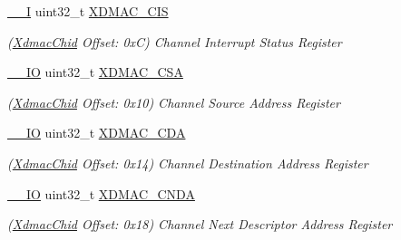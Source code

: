 \begin{DoxyCompactItemize}
\mbox{\label{structXdmacChid_a5105999966c7ec3deb32f942088364ee}} 
\mbox{\hyperlink{core__cm7_8h_af63697ed9952cc71e1225efe205f6cd3}{\+\_\+\+\_\+I}} uint32\+\_\+t \mbox{\hyperlink{structXdmacChid_a5105999966c7ec3deb32f942088364ee}{X\+D\+M\+A\+C\+\_\+\+C\+IS}}
\begin{DoxyCompactList}\small\item\em (\mbox{\hyperlink{structXdmacChid}{Xdmac\+Chid}} Offset\+: 0xC) Channel Interrupt Status Register \end{DoxyCompactList}\item 
\mbox{\label{structXdmacChid_ac8ee344a687cdd63e85b77b9ed48d9bc}} 
\mbox{\hyperlink{core__cm7_8h_aec43007d9998a0a0e01faede4133d6be}{\+\_\+\+\_\+\+IO}} uint32\+\_\+t \mbox{\hyperlink{structXdmacChid_ac8ee344a687cdd63e85b77b9ed48d9bc}{X\+D\+M\+A\+C\+\_\+\+C\+SA}}
\begin{DoxyCompactList}\small\item\em (\mbox{\hyperlink{structXdmacChid}{Xdmac\+Chid}} Offset\+: 0x10) Channel Source Address Register \end{DoxyCompactList}\item 
\mbox{\label{structXdmacChid_ab8fec84591862c9c18a34b7f6948a48c}} 
\mbox{\hyperlink{core__cm7_8h_aec43007d9998a0a0e01faede4133d6be}{\+\_\+\+\_\+\+IO}} uint32\+\_\+t \mbox{\hyperlink{structXdmacChid_ab8fec84591862c9c18a34b7f6948a48c}{X\+D\+M\+A\+C\+\_\+\+C\+DA}}
\begin{DoxyCompactList}\small\item\em (\mbox{\hyperlink{structXdmacChid}{Xdmac\+Chid}} Offset\+: 0x14) Channel Destination Address Register \end{DoxyCompactList}\item 
\mbox{\label{structXdmacChid_aedf874eb46f9e7ed0f6a45f41709140a}} 
\mbox{\hyperlink{core__cm7_8h_aec43007d9998a0a0e01faede4133d6be}{\+\_\+\+\_\+\+IO}} uint32\+\_\+t \mbox{\hyperlink{structXdmacChid_aedf874eb46f9e7ed0f6a45f41709140a}{X\+D\+M\+A\+C\+\_\+\+C\+N\+DA}}
\begin{DoxyCompactList}\small\item\em (\mbox{\hyperlink{structXdmacChid}{Xdmac\+Chid}} Offset\+: 0x18) Channel Next Descriptor Address Register \end{DoxyCompactList}\item 

\end{DoxyCompactItemize}
